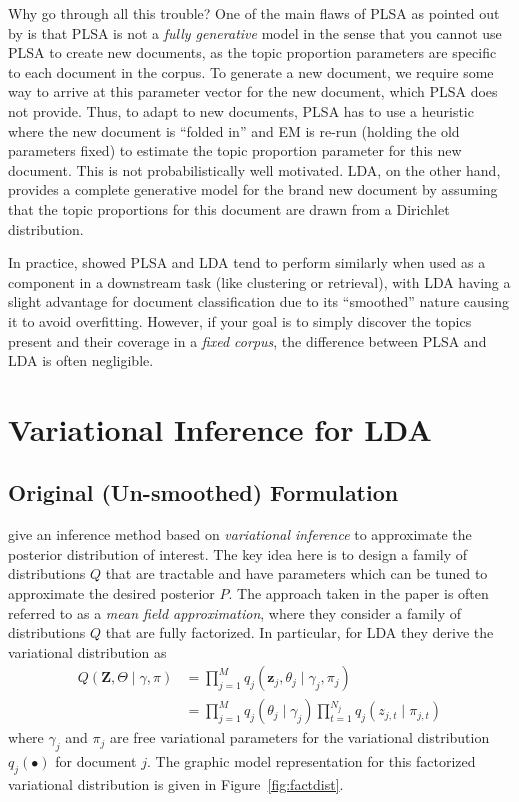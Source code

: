 \documentclass[11pt]{article}
\begin{document}
Why go through all this trouble? One of the main flaws of PLSA as pointed
out by \citet{Blei:2003:LDA} is that PLSA is not a \emph{fully generative}
model in the sense that you cannot use PLSA to create new documents, as the
topic proportion parameters are specific to each document in the corpus. To
generate a new document, we require some way to arrive at this parameter
vector for the new document, which PLSA does not provide. Thus, to adapt to
new documents, PLSA has to use a heuristic where the new document is
``folded in'' and EM is re-run (holding the old parameters fixed) to
estimate the topic proportion parameter for this new document. This is not
probabilistically well motivated. LDA, on the other hand, provides a
complete generative model for the brand new document by assuming that the
topic proportions for this document are drawn from a Dirichlet
distribution.

In practice, \citet{Lu:2011:JIR} showed PLSA and LDA tend to perform
similarly when used as a component in a downstream task (like clustering or
retrieval), with LDA having a slight advantage for document classification
due to its ``smoothed'' nature causing it to avoid overfitting. However, if
your goal is to simply discover the topics present and their coverage in a
\emph{fixed corpus}, the difference between PLSA and LDA is often
negligible.

\section{Variational Inference for LDA}
\subsection{Original (Un-smoothed) Formulation}

\citet{Blei:2003:LDA} give an inference method based on \emph{variational
inference} to approximate the posterior distribution of interest. The key
idea here is to design a family of distributions $Q$ that are tractable and
have parameters which can be tuned to approximate the desired posterior
$P$. The approach taken in the paper is often referred to as a \emph{mean
field approximation}, where they consider a family of distributions $Q$
that are fully factorized. In particular, for LDA they derive the
variational distribution as
\begin{align}
  Q(\mathbf{Z}, \Theta \mid \gamma, \pi)
  &= \prod_{j=1}^M q_j(\mathbf{z}_j, \theta_j \mid \gamma_j, \pi_j)\\
  &= \prod_{j=1}^M q_j(\theta_j \mid
  \gamma_j) \prod_{t=1}^{N_j} q_j(z_{j,t} \mid \pi_{j,t})
\end{align}
where $\gamma_j$ and $\pi_{j}$ are free variational parameters for the
variational distribution $q_j(\bullet)$ for document $j$. The graphic model
representation for this factorized variational distribution is given in
Figure~\ref{fig:factdist}.
\end{document}
